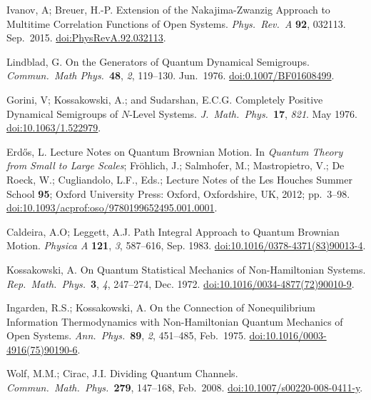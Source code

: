 \documentclass[preprints,article,accept,moreauthors,pdftex]{Definitions/mdpi}
\begin{document}
\begin{thebibliography}{999}
Ivanov, A; Breuer, H.-P\@. Extension of the Nakajima-Zwanzig Approach to Multitime Correlation Functions of Open Systems. {\em Phys.\ Rev.\ A} {\bf 92}, 032113. Sep.\ 2015. \href{https://doi.org/10.1103/PhysRevA.92.032113}{doi:PhysRevA.92.032113}.

Lindblad, G\@. On the Generators of Quantum Dynamical Semigroups. {\em Commun.\ Math Phys.}\ {\bf 48}, {\em 2}, 119--130. Jun.\ 1976. \href{https://doi.org/10.1007/BF01608499}{doi:0.1007/BF01608499}.

Gorini, V; Kossakowski, A.; and Sudarshan, E.C.G. Completely Positive Dynamical Semigroups of $N$-Level Systems. {\em J.\ Math.\ Phys.}\ {\bf 17}, {\em 821}. May 1976. \href{https://doi.org/10.1063/1.522979}{doi:10.1063/1.522979}.

Erdős, L\@. Lecture Notes on Quantum Brownian Motion. In \emph{Quantum Theory from Small to Large Scales}; Fröhlich, J.; Salmhofer, M.; Mastropietro, V.; De Roeck, W.; Cugliandolo, L.F., Eds.; Lecture Notes of the Les Houches Summer School {\bf 95}; Oxford University Press: Oxford, Oxfordshire, UK, 2012; pp.~3--98. \href{https://10.1093/acprof:oso/9780199652495.001.0001}{doi:10.1093/acprof:oso/9780199652495.001.0001}.

Caldeira, A.O; Leggett, A.J\@. Path Integral Approach to Quantum Brownian Motion. {\em Physica A} {\bf 121}, {\em 3}, 587--616, Sep. 1983. \href{https://doi.org/10.1016/0378-4371(83)90013-4}{doi:10.1016/0378-4371(83)90013-4}.

Kossakowski, A\@. On Quantum Statistical Mechanics of Non-Hamiltonian Systems. {\em Rep.\ Math.\ Phys.}\ {\bf 3}, {\em 4}, 247--274, Dec. 1972. \href{https://doi.org/10.1016/0034-4877(72)90010-9}{doi:10.1016/0034-4877(72)90010-9}.

Ingarden, R.S.; Kossakowski, A\@. On the Connection of Nonequilibrium Information Thermodynamics with Non-Hamiltonian Quantum Mechanics of Open Systems. {\em Ann.\ Phys.}\ {\bf 89}, {\em 2}, 451--485, Feb.\ 1975. \href{https://doi.org/10.1016/0003-4916(75)90190-6}{doi:10.1016/0003-4916(75)90190-6}.

Wolf, M.M.; Cirac, J.I\@. Dividing Quantum Channels. {\em Commun.\ Math.\ Phys.}\ {\bf 279}, 147--168, Feb.\ 2008. \href{https://doi.org/10.1007/s00220-008-0411-y}{doi:10.1007/s00220-008-0411-y}.


\end{thebibliography}
\end{document}
